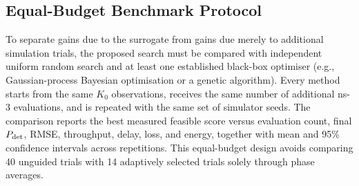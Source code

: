 \subsection{Equal-Budget Benchmark Protocol}
\label{sec:optimisation-benchmarks}

To separate gains due to the surrogate from gains due merely to additional
simulation trials, the proposed search must be compared with independent
uniform random search and at least one established black-box optimiser (e.g.,
Gaussian-process Bayesian optimisation or a genetic algorithm). Every method
starts from the same $K_0$ observations, receives the same number of additional
ns-3 evaluations, and is repeated with the same set of simulator seeds. The
comparison reports the best measured feasible score versus evaluation count,
final $P_{\rm det}$, RMSE, throughput, delay, loss, and energy, together with
mean and 95\% confidence intervals across repetitions. This equal-budget
design avoids comparing 40 unguided trials with 14 adaptively selected trials
solely through phase averages.

